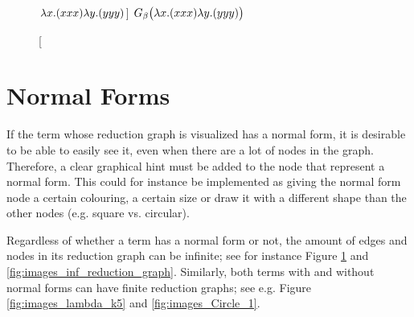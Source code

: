 \begin{figure}[tpb]
	\centering
	\caption
	[$\lambda x.(xxx) \lambda y.(yyy)$]
	{$G_\beta\big(\lambda x.(xxx) \lambda y.(yyy)\big)$}
	\label{fig:images_inf_reduction_graph_2}
\end{figure}

\section{Normal Forms}

If the term whose reduction graph is visualized has a normal form, it is
desirable to be able to easily see it, even when there are a lot of nodes in
the graph. Therefore, a clear graphical hint must be added to the node that
represent a normal form. This could for instance be implemented as giving the
normal form node a certain colouring, a certain size or draw it with a
different shape than the other nodes (e.g. square vs. circular).

\fact Regardless of whether a term has a normal form or not, the amount
of edges and nodes in its reduction graph can be infinite; see for instance Figure 
\ref{fig:images_inf_reduction_graph_2} and \ref{fig:images_inf_reduction_graph}.
Similarly, both terms with and without normal forms can have finite reduction graphs;
see e.g. Figure \ref{fig:images_lambda_k5} and \ref{fig:images_Circle_1}.

% 
